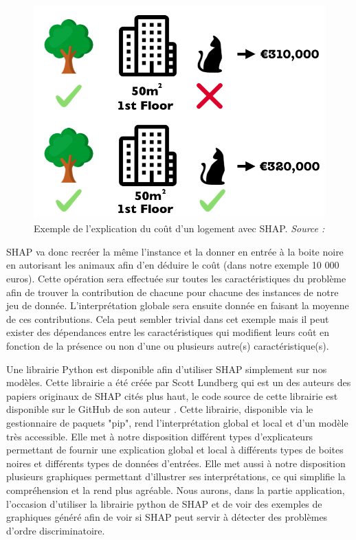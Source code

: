 \begin{figure}[h]
\centering
\includegraphics[scale=0.3]{src_img/shapleyExemple.png}
\caption{Exemple de l'explication du coût d'un logement avec SHAP. \textit{Source : \cite{molnar2019}}}
\label{shapleyExemple}
\end{figure}

SHAP va donc recréer la même l'instance et la donner en entrée à la boite noire en autorisant les animaux afin d'en déduire le coût (dans notre exemple 10 000 euros). Cette opération sera effectuée sur toutes les caractéristiques du problème afin de trouver la contribution de chacune pour chacune des instances de notre jeu de donnée. L'interprétation globale sera ensuite donnée en faisant la moyenne de ces contributions. Cela peut sembler trivial dans cet exemple mais il peut exister des dépendances entre les caractéristiques qui modifient leurs coût en fonction de la présence ou non d'une ou plusieurs autre(s) caractéristique(s).\par

Une librairie Python est disponible afin d'utiliser SHAP simplement sur nos modèles. Cette librairie a été créée par Scott Lundberg qui est un des auteurs des papiers originaux de SHAP cités plus haut, le code source de cette librairie est disponible sur le GitHub de son auteur \cite{shapDepot}. Cette librairie, disponible via le gestionnaire de paquets "pip", rend l'interprétation global et local et d'un modèle très accessible. Elle met à notre disposition différent types d'explicateurs permettant de fournir une explication global et local à différents types de boites noires et différents types de données d'entrées. Elle met aussi à notre disposition plusieurs graphiques permettant d'illustrer ses interprétations, ce qui simplifie la compréhension et la rend plus agréable.  Nous aurons, dans la partie application, l'occasion d'utiliser la librairie python de SHAP et de voir des exemples de graphiques généré afin de voir si SHAP peut servir à détecter des problèmes d'ordre discriminatoire.


